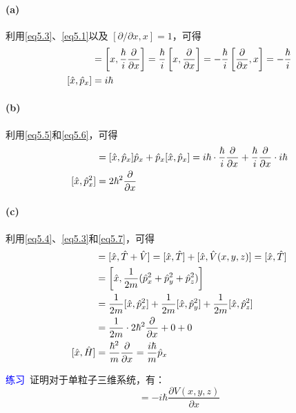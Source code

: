 \documentclass[12pt,a4paper,openany]{ctexbook}
\begin{document}
\begin{flushleft}
\begin{examplebox}
\paragraph{(a)} 利用\eqref{eq5.3}、\eqref{eq5.1}以及 $[\partial/\partial x, x] = 1$，可得
\begin{align}
[\hat{x}, \hat{p}_x] &= \left[x, \frac{\hbar}{i} \frac{\partial}{\partial x}\right] = \frac{\hbar}{i}\left[x, \frac{\partial}{\partial x}\right] = -\frac{\hbar}{i}\left[\frac{\partial}{\partial x}, x\right] = -\frac{\hbar}{i} \notag \\
[\hat{x}, \hat{p}_x] &= i\hbar \label{eq5.6}
\end{align}

\paragraph{(b)} 利用\eqref{eq5.5}和\eqref{eq5.6}，可得
\begin{align}
[\hat{x}, \hat{p}_x^2] &= [\hat{x}, \hat{p}_x]\hat{p}_x + \hat{p}_x[\hat{x}, \hat{p}_x] = i\hbar \cdot \frac{\hbar}{i} \frac{\partial}{\partial x} + \frac{\hbar}{i} \frac{\partial}{\partial x} \cdot i\hbar \notag \\
[\hat{x}, \hat{p}_x^2] &= 2\hbar^2 \frac{\partial}{\partial x} \label{eq5.7}
\end{align}

\paragraph{(c)} 利用\eqref{eq5.4}、\eqref{eq5.3}和\eqref{eq5.7}，可得
\begin{align}
[\hat{x}, \hat{H}] &= [\hat{x}, \hat{T} + \hat{V}] = [\hat{x}, \hat{T}] + [\hat{x}, \hat{V}(x, y, z)] = [\hat{x}, \hat{T}] \notag \\
&= \left[\hat{x}, \frac{1}{2m}(\hat{p}_x^2 + \hat{p}_y^2 + \hat{p}_z^2)\right] \notag \\
&= \frac{1}{2m}[\hat{x}, \hat{p}_x^2] + \frac{1}{2m}[\hat{x}, \hat{p}_y^2] + \frac{1}{2m}[\hat{x}, \hat{p}_z^2] \notag \\
&= \frac{1}{2m} \cdot 2\hbar^2 \frac{\partial}{\partial x} + 0 + 0 \notag \\
[\hat{x}, \hat{H}] &= \frac{\hbar^2}{m} \frac{\partial}{\partial x} = \frac{i\hbar}{m} \hat{p}_x \label{eq5.8}
\end{align}

\textcolor{blue}{\large 练习}\ 证明对于单粒子三维系统，有：
\begin{equation}
[\hat{p}_x, \hat{H}] = -i\hbar \frac{\partial V(x, y, z)}{\partial x} \label{eq5.9}
\end{equation}
\end{examplebox}


\end{flushleft}
\end{document}
